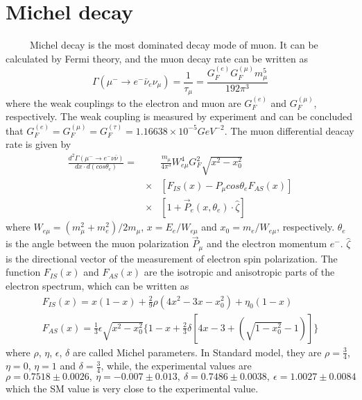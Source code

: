 \section{Michel decay}
~~~~~Michel decay is the most dominated decay mode of muon.
It can be calculated by Fermi theory, and the muon decay rate can be written as
\begin{equation}
 \Gamma (\mu^- \rightarrow e^- \bar \nu_e \nu_\mu) = \frac{1}{\tau_\mu} = \frac{G_F^{(e)} G_F^{(\mu)} m_\mu^5}{192 \pi^3}
\end{equation}
where the weak couplings to the electron and muon are $G_F^{(e)}$ and $G_F^{(\mu)}$, respectively.
The weak coupling is measured by experiment and can be concluded that $G_F^{(e)} = G_F^{(\mu)} = G_F^{(\tau)} = 1.16638\times10^{-5} GeV^{-2}$. 
The muon differential deacay rate is given by~\cite{kuno}
\begin{eqnarray*}
 \frac{d^2 \Gamma (\mu^-\rightarrow e^-\nu\bar\nu)}{dx \cdot d(cos\theta_e)} = &&\frac{m_\mu}{4\pi^3} W^4_{e\mu}G^2_F\sqrt{x^2-x^2_0} \\
 &\times&[F_{IS}(x)-P_\mu cos\theta_e F_{AS}(x)] \\
 &\times&[1 + \vec{P}_e(x, \theta_e) \cdot \hat{\zeta}]
\end{eqnarray*}
where $W_{e\mu} = (m_\mu^2+m_e^2)/2m_\mu$, $x = E_e/W_{e\mu}$ and $x_0 = m_e/W_{e\mu}$, respectively.
$\theta_e$ is the angle between the muon polarization $\vec{P}_\mu$ and the electron momentum $e^-$.
$\hat{\zeta}$ is the directional vector of the measurement of electron spin polarization.
The function $F_{IS}(x)$ and $F_{AS}(x)$ are the isotropic and anisotropic parts of the electron spectrum, which can be written as
\begin{gather}
 F_{IS}(x) = x(1-x) + \frac{2}{9}\rho(4x^2-3x-x_0^2) + \eta_0(1-x) \\
 F_{AS}(x) = \frac{1}{3}\epsilon\sqrt{x^2-x_0^2}\{1-x+\frac{2}{3}\delta [4x-3+(\sqrt{1-x_0^2}-1)]\}
\end{gather}
where $\rho$, $\eta$, $\epsilon$, $\delta$ are called Michel parameters.
In Standard model, they are $\rho = \frac{3}{4}$, $\eta = 0$, $\eta = 1$ and $\delta = \frac{3}{4}$, while, the experimental values are
\begin{equation}
 \rho = 0.7518\pm0.0026,~\eta = -0.007\pm0.013,~\delta = 0.7486\pm0.0038,~\epsilon = 1.0027\pm0.0084
\end{equation}
which the SM value is very close to the experimental value.

\newpage
